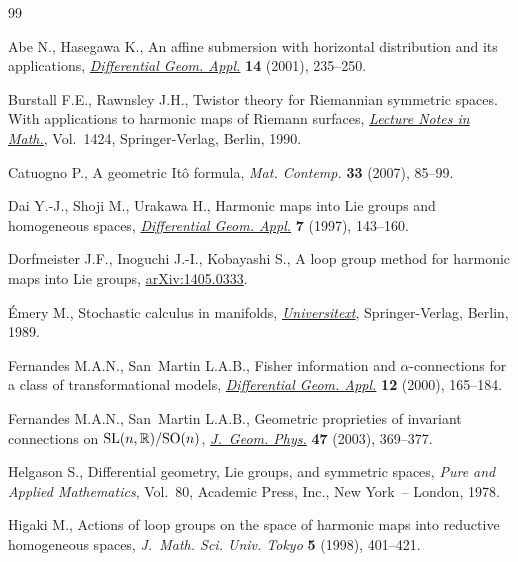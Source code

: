 \documentclass[pdftex]{sigma}
\numberwithin{equation}{section}
\begin{document}
\begin{thebibliography}{99}
\footnotesize \itemsep=-1pt

Abe N., Hasegawa K., An af\/f\/ine submersion with horizontal distribution and its
  applications, \href{http://dx.doi.org/10.1016/S0926-2245(01)00034-1}{\textit{Differential Geom. Appl.}} \textbf{14} (2001), 235--250.

Burstall F.E., Rawnsley J.H., Twistor theory for {R}iemannian symmetric spaces.
  With applications to harmonic maps of Riemann surfaces, \href{http://dx.doi.org/10.1007/BFb0095561}{\textit{Lecture Notes
  in Math.}}, Vol.~1424, Springer-Verlag, Berlin, 1990.

Catuogno P., A geometric {I}t\^o formula, \textit{Mat. Contemp.} \textbf{33}
  (2007), 85--99.

Dai Y.-J., Shoji M., Urakawa H., Harmonic maps into {L}ie groups and homogeneous
  spaces, \href{http://dx.doi.org/10.1016/S0926-2245(96)00045-9}{\textit{Differential Geom. Appl.}} \textbf{7} (1997), 143--160.

Dorfmeister J.F., Inoguchi J.-I., Kobayashi S., A loop group method for harmonic
  maps into Lie groups, \href{http://arxiv.org/abs/1405.0333}{arXiv:1405.0333}.

{\'E}mery M., Stochastic calculus in manifolds, \href{http://dx.doi.org/10.1007/978-3-642-75051-9}{\textit{Universitext}}, Springer-Verlag,
  Berlin, 1989.

Fernandes M.A.N., San~Martin L.A.B., Fisher information and
  {$\alpha$}-connections for a class of transformational models,
  \href{http://dx.doi.org/10.1016/S0926-2245(00)00010-3}{\textit{Differential Geom. Appl.}} \textbf{12} (2000), 165--184.

Fernandes M.A.N., San~Martin L.A.B., Geometric proprieties of invariant
  connections on {${\rm SL}(n,{\mathbb R})/{\rm SO}(n)$}, \href{http://dx.doi.org/10.1016/S0393-0440(02)00225-5}{\textit{J.~Geom.
  Phys.}} \textbf{47} (2003), 369--377.

Helgason S., Dif\/ferential geometry, {L}ie groups, and symmetric spaces,
  \textit{Pure and Applied Mathematics}, Vol.~80, Academic Press, Inc., New
  York~-- London, 1978.

Higaki M., Actions of loop groups on the space of harmonic maps into reductive
  homogeneous spaces, \textit{J.~Math. Sci. Univ. Tokyo} \textbf{5} (1998),
  401--421.


\end{thebibliography}
\end{document}
